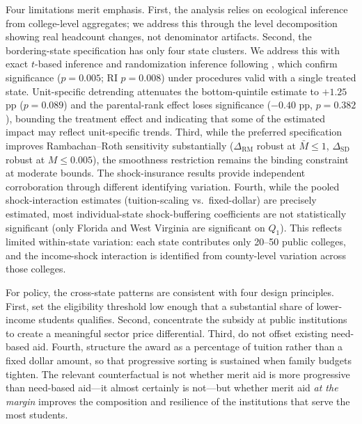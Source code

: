 Four limitations merit emphasis. First, the analysis relies on
ecological inference from college-level aggregates; we address this
through the level decomposition showing real headcount changes, not
denominator artifacts. Second, the bordering-state specification has
only four state clusters. We address this with exact $t$-based
inference and randomization inference following
\textcite{lee2026simple}, which confirm significance ($p = 0.005$;
RI $p = 0.008$) under procedures valid with a single treated state.
Unit-specific detrending attenuates the bottom-quintile estimate to
$+1.25$ pp ($p = 0.089$) and the parental-rank effect loses
significance ($-0.40$ pp, $p = 0.382$), bounding the treatment
effect and indicating that some of the estimated impact may reflect
unit-specific trends. Third, while the
preferred specification improves Rambachan--Roth sensitivity
substantially ($\Delta_\text{RM}$ robust at $\bar{M} \leq 1$,
$\Delta_\text{SD}$ robust at $M \leq 0.005$), the smoothness
restriction remains the binding constraint at moderate bounds. The
shock-insurance results provide independent corroboration through
different identifying variation. Fourth, while the pooled
shock-interaction estimates (tuition-scaling vs.\ fixed-dollar) are
precisely estimated, most individual-state shock-buffering coefficients
are not statistically significant (only Florida and West Virginia are
significant on $Q_1$). This reflects limited within-state variation:
each state contributes only 20--50 public colleges, and the
income-shock interaction is identified from county-level variation
across those colleges.

For policy, the cross-state patterns are consistent with four design
principles. First, set the eligibility threshold low enough that a
substantial share of lower-income students qualifies. Second,
concentrate the subsidy at public institutions to create a meaningful
sector price differential. Third, do not offset existing need-based
aid. Fourth, structure the award as a percentage of tuition rather than
a fixed dollar amount, so that progressive sorting is sustained when
family budgets tighten. The relevant counterfactual is not whether
merit aid is more progressive than need-based aid---it almost certainly
is not---but whether merit aid \emph{at the margin} improves the
composition and resilience of the institutions that serve the most
students.


